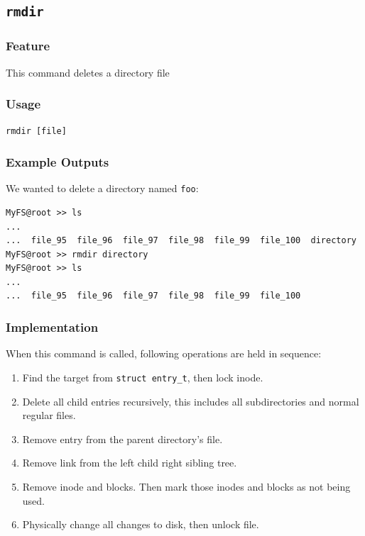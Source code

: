 \documentclass{homework}
\begin{document}
\pagebreak

\subsection{\texttt{rmdir}}
\subsubsection{Feature}
This command deletes a directory file
\subsubsection{Usage}
\begin{center}
\texttt{rmdir [file]}
\end{center}

\subsubsection{Example Outputs}
We wanted to delete a directory named \texttt{foo}:
\\
\begin{center}
\begin{code}
\begin{verbatim}
MyFS@root >> ls
...
...  file_95  file_96  file_97  file_98  file_99  file_100  directory
MyFS@root >> rmdir directory
MyFS@root >> ls
...
...  file_95  file_96  file_97  file_98  file_99  file_100 
\end{verbatim}
\end{code}
\end{center}

\subsubsection{Implementation}
When this command is called, following operations are held in sequence:
\begin{enumerate}
    \item Find the target from \texttt{struct entry_t}, then lock inode.
    \item Delete all child entries recursively, this includes all subdirectories and normal regular files.
    \item Remove entry from the parent directory's file.
    \item Remove link from the left child right sibling tree.
    \item Remove inode and blocks. Then mark those inodes and blocks as not being used.
    \item Physically change all changes to disk, then unlock file.
\end{enumerate}
\end{document}
